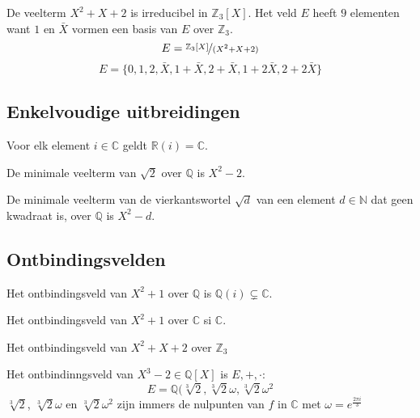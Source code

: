 \documentclass[main.tex]{subfiles}
\begin{document}
\begin{vb}
  De veelterm $X^{2}+X+2$ is irreducibel in $\mathbb{Z}_{3}[X]$.
  Het veld $E$ heeft $9$ elementen want $1$ en $\bar{X}$ vormen een basis van $E$ over $\mathbb{Z}_{3}$.
  \[ E = \nicefrac{\mathbb{Z}_{3}[X]}{(X^{2}+X+2)} \]
  \[ E = \{ 0,1,2, \bar{X}, 1+\bar{X}, 2+\bar{X}, 1+2\bar{X}, 2+2\bar{X} \} \]
\end{vb}

\subsection{Enkelvoudige uitbreidingen}

\begin{vb}
  Voor elk element $i\in \mathbb{C}$ geldt $\mathbb{R}(i) = \mathbb{C}$.
\end{vb}

\begin{vb}
  De minimale veelterm van $\sqrt{2}$ over $\mathbb{Q}$ is $X^{2}-2$.
\end{vb}

\begin{vb}
  De minimale veelterm van de vierkantswortel $\sqrt{d}$ van een element $d\in \mathbb{N}$ dat geen kwadraat is, over $\mathbb{Q}$ is $X^{2}-d$.
\end{vb}

\subsection{Ontbindingsvelden}

\begin{vb}
  Het ontbindingsveld van $X^{2}+1$ over $\mathbb{Q}$ is $\mathbb{Q}(i) \subsetneq \mathbb{C}$.
\end{vb}

\begin{vb}
  Het ontbindingsveld van $X^{2}+1$ over $\mathbb{C}$ si $\mathbb{C}$.
\end{vb}


\begin{vb}
  Het ontbindingsveld van $X^{2}+X+2$ over $\mathbb{Z}_{3}$ 
\end{vb}

\begin{vb}
  Het ontbindinngsveld van $X^{3}-2\in \mathbb{Q}[X]$ is $E,+,\cdot$:
  \[ E = \mathbb{Q}(\sqrt[3]{2},\sqrt[3]{2}\omega,\sqrt[3]{2}\omega^{2} \]
  $\sqrt[3]{2}$, $\sqrt[3]{2}\omega$ en $\sqrt[3]{2}\omega^{2}$ zijn immers de nulpunten van $f$ in $\mathbb{C}$ met $\omega = e^{\frac{2\pi i}{3}}$
\end{vb}
\end{document}
